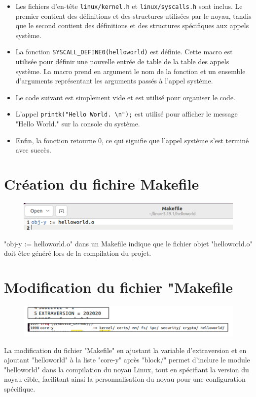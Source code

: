 \begin{itemize}
    \item Les fichiers d'en-tête \texttt{linux/kernel.h} et \texttt{linux/syscalls.h} sont inclus. Le premier contient des définitions et des structures utilisées par le noyau, tandis que le second contient des définitions et des structures spécifiques aux appels système.

    \item La fonction \texttt{SYSCALL\_DEFINE0(helloworld)} est définie. Cette macro est utilisée pour définir une nouvelle entrée de table de la table des appels système. La macro prend en argument le nom de la fonction et un ensemble d'arguments représentant les arguments passés à l'appel système.

    \item Le code suivant est simplement vide et est utilisé pour organiser le code.

    \item L'appel \texttt{printk("Hello World. \textbackslash n");} est utilisé pour afficher le message "Hello World." sur la console du système.

    \item Enfin, la fonction retourne 0, ce qui signifie que l'appel système s'est terminé avec succès.
\end{itemize}
\section{Création du fichire Makefile}
\begin{figure}[h]
    \includegraphics[width=1\textwidth]{images/30.png}   
\end{figure}
"obj-y := helloworld.o" dans un Makefile indique que le fichier objet "helloworld.o" doit être généré lors de la compilation du projet.

\section{Modification du fichier "Makefile}
\begin{figure}[h]
    \includegraphics[width=1\textwidth]{images/31.png}   
\end{figure}
La modification du fichier "Makefile" en ajustant la variable d'extraversion et en ajoutant "helloworld" à la liste "core-y" après "block/" permet d'inclure le module "helloworld" dans la compilation du noyau Linux, tout en spécifiant la version du noyau cible, facilitant ainsi la personnalisation du noyau pour une configuration spécifique.
